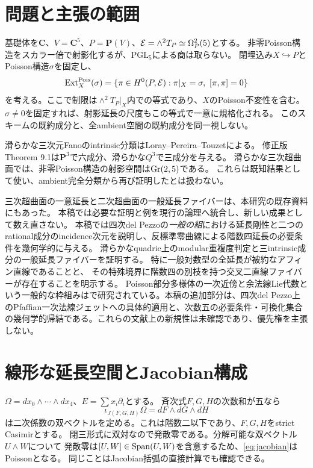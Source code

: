 \documentclass[a4paper,11pt]{ltjsarticle}
\theoremstyle{definition}
\theoremstyle{definition}\newtheorem{definition}[theorem]{定義}
\theoremstyle{remark}\newtheorem{remark}[theorem]{注意}
\newcommand{\PP}{\mathbf P}\renewcommand{\AA}{\mathbf A}\newcommand{\CC}{\mathbf C}
\newcommand{\ExtP}{\operatorname{Ext}^{\mathrm{Pois}}}
\begin{document}
\begin{abstract}
本稿は全147成分の分類を前提とせず、新しい成分数や全延長ファイバーの分類を主張しない。
\end{abstract}
\setcounter{tocdepth}{1}
\tableofcontents
\clearpage

\section{問題と主張の範囲}
基礎体を$\CC$、$V=\CC^5$、$P=\PP(V)$、$\mathcal E=\wedge^2T_P\simeq\Omega_P^2(5)$とする。
非零Poisson構造をスカラー倍で射影化するが、$\mathrm{PGL}_5$による商は取らない。
閉埋込み$X\hookrightarrow P$とPoisson構造$\sigma$を固定し、
\[
 \ExtP_X(\sigma)=\{\pi\in H^0(P,\cE):\pi|_X=\sigma,\ [\pi,\pi]=0\}
\]
を考える。ここで制限は$\wedge^2T_P|_X$内での等式であり、$X$のPoisson不変性を含む。
$\sigma\ne0$を固定すれば、射影延長の尺度もこの等式で一意に規格化される。
このスキームの既約成分と、全ambient空間の既約成分を同一視しない。

滑らかな三次元Fanoのintrinsic分類はLoray--Pereira--Touzet\cite{LPT}による。
修正版Theorem 9.1は$\PP^3$で六成分、滑らかな$Q^3$で三成分を与える。
滑らかな三次超曲面では、非零Poisson構造の射影空間は$\operatorname{Gr}(2,5)$である\cite[Theorem 1]{May}。
これらは既知結果として使い、ambient完全分類から再び証明したとは扱わない。

三次超曲面の一意延長と二次超曲面の一般延長ファイバーは、本研究の既存資料にもあった。
本稿では必要な証明と例を現行の論理へ統合し、新しい成果として数え直さない。
本稿では四次del Pezzoの\emph{一般の組}における延長剛性と二つのrational成分のincidence次元を説明し、反標準零曲線による階数四延長の必要条件を幾何学的に与える。
滑らかなquadric上のmodular重複度判定と三intrinsic成分の一般延長ファイバーを証明する。
特に一般対数型の全延長が被約なアフィン直線であることと、
その特殊境界に階数四の別枝を持つ交叉二直線ファイバーが存在することを明示する。
Poisson部分多様体の一次近傍と余法線Lie代数という一般的な枠組みは\cite{FM2026}で研究されている。本稿の追加部分は、四次del Pezzo上のPfaffian一次法線ジェットへの具体的適用と、次数五の必要条件・可換化集合の幾何学的帰結である。これらの文献上の新規性は未確認であり、優先権を主張しない。

\section{線形な延長空間とJacobian構成}
$\Omega=dx_0\wedge\cdots\wedge dx_4$、$E=\sum x_i\partial_i$とする。
斉次式$F,G,H$の次数和が五なら
\begin{equation}
 \iota_{J(F,G,H)}\Omega=dF\wedge dG\wedge dH                 \label{eq:jacobian}
\end{equation}
は二次係数の双ベクトルを定める。これは階数二以下であり、$F,G,H$をstrict Casimirとする。
閉三形式に双対なので発散零である。分解可能な双ベクトル$U\wedge W$について
発散零は$[U,W]\in\operatorname{Span}(U,W)$を含意するため、\eqref{eq:jacobian}はPoissonとなる。
同じことはJacobian括弧の直接計算でも確認できる。
\end{document}
